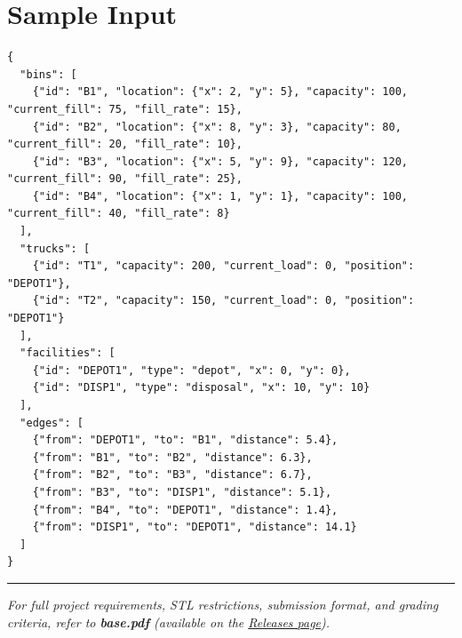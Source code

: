 \section{Sample Input}

\begin{lstlisting}[style=json, caption={data/input\_sample.json}]
{
  "bins": [
    {"id": "B1", "location": {"x": 2, "y": 5}, "capacity": 100, "current_fill": 75, "fill_rate": 15},
    {"id": "B2", "location": {"x": 8, "y": 3}, "capacity": 80, "current_fill": 20, "fill_rate": 10},
    {"id": "B3", "location": {"x": 5, "y": 9}, "capacity": 120, "current_fill": 90, "fill_rate": 25},
    {"id": "B4", "location": {"x": 1, "y": 1}, "capacity": 100, "current_fill": 40, "fill_rate": 8}
  ],
  "trucks": [
    {"id": "T1", "capacity": 200, "current_load": 0, "position": "DEPOT1"},
    {"id": "T2", "capacity": 150, "current_load": 0, "position": "DEPOT1"}
  ],
  "facilities": [
    {"id": "DEPOT1", "type": "depot", "x": 0, "y": 0},
    {"id": "DISP1", "type": "disposal", "x": 10, "y": 10}
  ],
  "edges": [
    {"from": "DEPOT1", "to": "B1", "distance": 5.4},
    {"from": "B1", "to": "B2", "distance": 6.3},
    {"from": "B2", "to": "B3", "distance": 6.7},
    {"from": "B3", "to": "DISP1", "distance": 5.1},
    {"from": "B4", "to": "DEPOT1", "distance": 1.4},
    {"from": "DISP1", "to": "DEPOT1", "distance": 14.1}
  ]
}
\end{lstlisting}

\vfill
\noindent\rule{\textwidth}{0.4pt}
{\small\textit{For full project requirements, STL restrictions, submission format, and grading criteria, refer to \textbf{base.pdf} (available on the \href{https://github.com/BestSithInEU/cse211-term-projects/releases}{Releases page}).}}
